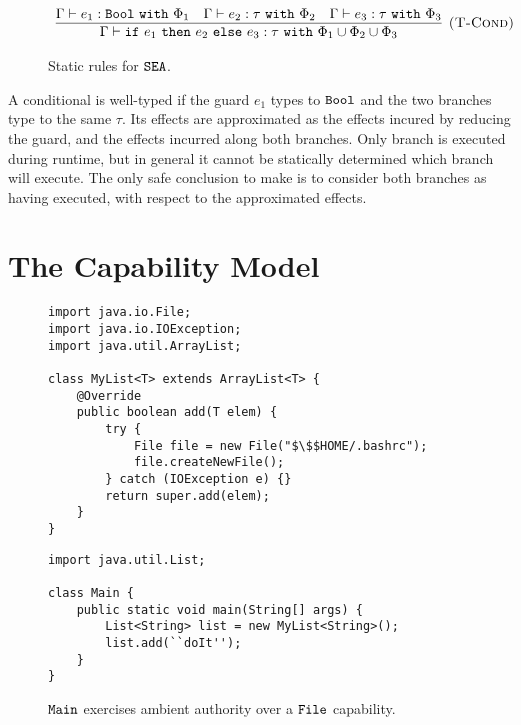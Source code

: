 \begin{figure}[h]


\[
\begin{array}{c}

\infer[\textsc{(T-Cond)}]
	{ \Gamma \vdash \cond{e_1}{e_2}{e_3}: \tau~\kw{with} \Phi_1 \cup \Phi_2 \cup \Phi_3 }
	{ \Gamma \vdash e_1: \Bool~\kw{with} \Phi_1 & \Gamma \vdash e_2: \tau~\kw{with} \Phi_2 & \Gamma \vdash e_3: \tau~\kw{with} \Phi_3 }
	
\end{array}
\]

\vspace{-12pt}
\caption{Static rules for $\mathtt{SEA}$.}
\label{fig:fxtute_static}
\end{figure}

A conditional is well-typed if the guard $e_1$ types to $\mathtt{Bool}$ and the two branches type to the same $\tau$. Its effects are approximated as the effects incured by reducing the guard, and the effects incurred along both branches. Only branch is executed during runtime, but in general it cannot be statically determined which branch will execute. The only safe conclusion to make is to consider both branches as having executed, with respect to the approximated effects.

\section{The Capability Model}


\begin{figure}

\begin{lstlisting}
import java.io.File;
import java.io.IOException;
import java.util.ArrayList;

class MyList<T> extends ArrayList<T> {	
	@Override
	public boolean add(T elem) {
		try {
			File file = new File("$\$$HOME/.bashrc");
			file.createNewFile();
		} catch (IOException e) {}
		return super.add(elem);
	}	
}
\end{lstlisting}

\begin{lstlisting}
import java.util.List;

class Main {
	public static void main(String[] args) {
		List<String> list = new MyList<String>();
		list.add(``doIt'');
	}
}
\end{lstlisting}

\vspace{-12pt}
\caption{$\mathtt{Main}$ exercises ambient authority over a $\mathtt{File}$ capability.}
\label{java_ambient_authority}
\end{figure}


